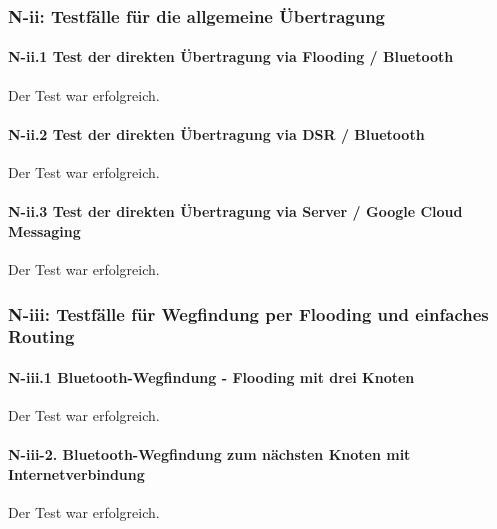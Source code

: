 \subsubsection{N-ii: Testfälle für die allgemeine Übertragung}

\paragraph{N-ii.1 Test der direkten Übertragung via Flooding / Bluetooth}
Der Test war erfolgreich.


\paragraph{N-ii.2 Test der direkten Übertragung via DSR / Bluetooth}
Der Test war erfolgreich.



\paragraph{N-ii.3 Test der direkten Übertragung via Server / Google Cloud Messaging}
Der Test war erfolgreich.


\subsubsection{N-iii: Testfälle für Wegfindung per Flooding und einfaches Routing}

\paragraph{N-iii.1 Bluetooth-Wegfindung - Flooding mit drei Knoten}
Der Test war erfolgreich.


\paragraph{N-iii-2. Bluetooth-Wegfindung zum nächsten Knoten mit Internetverbindung}
Der Test war erfolgreich.


